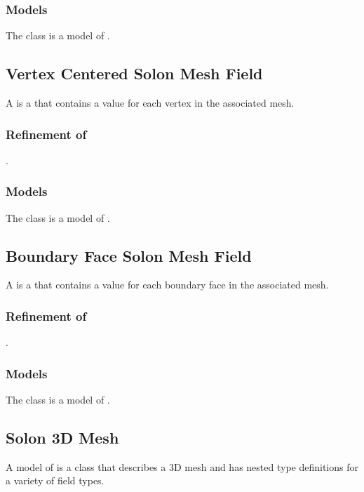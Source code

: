 \documentclass[11pt]{rnote}
\begin{document}
\subsubsection{Models}

The  class is a model of .

\subsection{Vertex Centered Solon Mesh Field}

A  is a  that contains a value for each vertex in the associated mesh.

\subsubsection{Refinement of}
.

\subsubsection{Models}

The  class is a model of .

\bigskip

\subsection{Boundary Face Solon Mesh Field}

A  is a  that contains a value for each boundary face in the
associated mesh.

\subsubsection{Refinement of}
.

\subsubsection{Models}

The  class is a model of .


\newpage

\subsection{Solon 3D Mesh}
\label{sec:solon 3d mesh}
A model of  is a class that describes a
3D mesh and has nested type definitions for a variety of field types.
\end{document}
